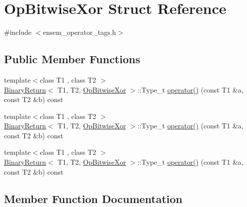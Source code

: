 \hypertarget{structOpBitwiseXor}{}\section{Op\+Bitwise\+Xor Struct Reference}
\label{structOpBitwiseXor}


{\ttfamily \#include $<$ensem\+\_\+operator\+\_\+tags.\+h$>$}

\subsection*{Public Member Functions}
\begin{DoxyCompactItemize}
\item 
{\footnotesize template$<$class T1 , class T2 $>$ }\\\mbox{\hyperlink{structBinaryReturn}{Binary\+Return}}$<$ T1, T2, \mbox{\hyperlink{structOpBitwiseXor}{Op\+Bitwise\+Xor}} $>$\+::Type\+\_\+t \mbox{\hyperlink{structOpBitwiseXor_af0ce6a043ad61e902b5303b11a36ce4b}{operator()}} (const T1 \&a, const T2 \&b) const
\item 
{\footnotesize template$<$class T1 , class T2 $>$ }\\\mbox{\hyperlink{structBinaryReturn}{Binary\+Return}}$<$ T1, T2, \mbox{\hyperlink{structOpBitwiseXor}{Op\+Bitwise\+Xor}} $>$\+::Type\+\_\+t \mbox{\hyperlink{structOpBitwiseXor_af0ce6a043ad61e902b5303b11a36ce4b}{operator()}} (const T1 \&a, const T2 \&b) const
\item 
{\footnotesize template$<$class T1 , class T2 $>$ }\\\mbox{\hyperlink{structBinaryReturn}{Binary\+Return}}$<$ T1, T2, \mbox{\hyperlink{structOpBitwiseXor}{Op\+Bitwise\+Xor}} $>$\+::Type\+\_\+t \mbox{\hyperlink{structOpBitwiseXor_af0ce6a043ad61e902b5303b11a36ce4b}{operator()}} (const T1 \&a, const T2 \&b) const
\end{DoxyCompactItemize}


\subsection{Member Function Documentation}
\mbox{\label{structOpBitwiseXor_af0ce6a043ad61e902b5303b11a36ce4b}} 
